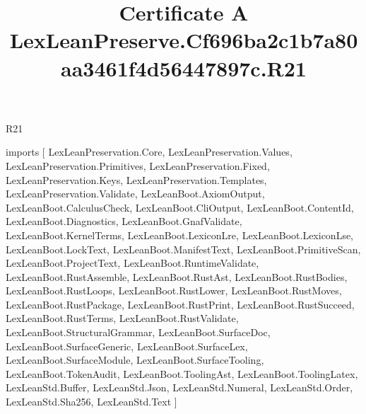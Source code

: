 \begin{lexlean}{R21}
\title{Certificate A LexLeanPreserve.Cf696ba2c1b7a80aa3461f4d56447897c.R21}
\begin{coremodule}
imports [
  LexLeanPreservation.Core,
  LexLeanPreservation.Values,
  LexLeanPreservation.Primitives,
  LexLeanPreservation.Fixed,
  LexLeanPreservation.Keys,
  LexLeanPreservation.Templates,
  LexLeanPreservation.Validate,
  LexLeanBoot.AxiomOutput,
  LexLeanBoot.CalculusCheck,
  LexLeanBoot.CliOutput,
  LexLeanBoot.ContentId,
  LexLeanBoot.Diagnostics,
  LexLeanBoot.GnafValidate,
  LexLeanBoot.KernelTerms,
  LexLeanBoot.LexiconLre,
  LexLeanBoot.LexiconLse,
  LexLeanBoot.LockText,
  LexLeanBoot.ManifestText,
  LexLeanBoot.PrimitiveScan,
  LexLeanBoot.ProjectText,
  LexLeanBoot.RuntimeValidate,
  LexLeanBoot.RustAssemble,
  LexLeanBoot.RustAst,
  LexLeanBoot.RustBodies,
  LexLeanBoot.RustLoops,
  LexLeanBoot.RustLower,
  LexLeanBoot.RustMoves,
  LexLeanBoot.RustPackage,
  LexLeanBoot.RustPrint,
  LexLeanBoot.RustSucceed,
  LexLeanBoot.RustTerms,
  LexLeanBoot.RustValidate,
  LexLeanBoot.StructuralGrammar,
  LexLeanBoot.SurfaceDoc,
  LexLeanBoot.SurfaceGeneric,
  LexLeanBoot.SurfaceLex,
  LexLeanBoot.SurfaceModule,
  LexLeanBoot.SurfaceTooling,
  LexLeanBoot.TokenAudit,
  LexLeanBoot.ToolingAst,
  LexLeanBoot.ToolingLatex,
  LexLeanStd.Buffer,
  LexLeanStd.Json,
  LexLeanStd.Numeral,
  LexLeanStd.Order,
  LexLeanStd.Sha256,
  LexLeanStd.Text
]


\end{coremodule}
\end{lexlean}
